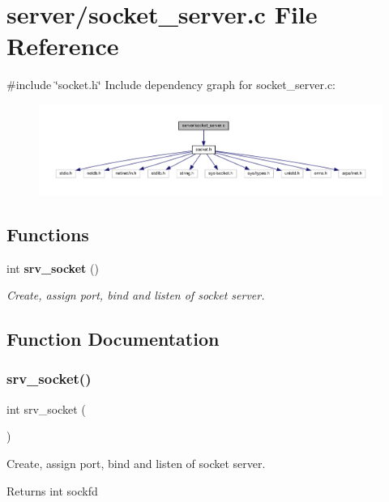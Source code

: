 \section{server/socket\+\_\+server.c File Reference}
\label{socket__server_8c}
{\ttfamily \#include \char`\"{}socket.\+h\char`\"{}}\newline
Include dependency graph for socket\+\_\+server.\+c\+:\nopagebreak
\begin{figure}[H]
\begin{center}
\leavevmode
\includegraphics[width=350pt]{socket__server_8c__incl}
\end{center}
\end{figure}
\subsection*{Functions}
\begin{DoxyCompactItemize}
\item 
int \textbf{ srv\+\_\+socket} ()
\begin{DoxyCompactList}\small\item\em Create, assign port, bind and listen of socket server. \end{DoxyCompactList}\end{DoxyCompactItemize}


\subsection{Function Documentation}
\mbox{\label{socket__server_8c_abaa85d7aff16c338adf9a408c151bc28}} 
\subsubsection{srv\+\_\+socket()}
{\footnotesize\ttfamily int srv\+\_\+socket (\begin{DoxyParamCaption}{ }\end{DoxyParamCaption})}



Create, assign port, bind and listen of socket server. 

\begin{DoxyReturn}{Returns}
int sockfd 
\end{DoxyReturn}
